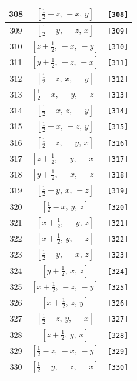 \documentclass[fleqn,8pt]{jsarticle}
\begin{document}
\begin{longtable}{ccc}
308 & $\left[ \frac{1}{2} - z,\, - x,\, y \right]$ & {\tt [308]} \\ \hline
309 & $\left[ \frac{1}{2} - y,\, - z,\, x \right]$ & {\tt [309]} \\ \hline
310 & $\left[ z + \frac{1}{2},\, - x,\, - y \right]$ & {\tt [310]} \\ \hline
311 & $\left[ y + \frac{1}{2},\, - z,\, - x \right]$ & {\tt [311]} \\ \hline
312 & $\left[ \frac{1}{2} - z,\, x,\, - y \right]$ & {\tt [312]} \\ \hline
313 & $\left[ \frac{1}{2} - x,\, - y,\, - z \right]$ & {\tt [313]} \\ \hline
314 & $\left[ \frac{1}{2} - x,\, z,\, - y \right]$ & {\tt [314]} \\ \hline
315 & $\left[ \frac{1}{2} - x,\, - z,\, y \right]$ & {\tt [315]} \\ \hline
316 & $\left[ \frac{1}{2} - z,\, - y,\, x \right]$ & {\tt [316]} \\ \hline
317 & $\left[ z + \frac{1}{2},\, - y,\, - x \right]$ & {\tt [317]} \\ \hline
318 & $\left[ y + \frac{1}{2},\, - x,\, - z \right]$ & {\tt [318]} \\ \hline
319 & $\left[ \frac{1}{2} - y,\, x,\, - z \right]$ & {\tt [319]} \\ \hline
320 & $\left[ \frac{1}{2} - x,\, y,\, z \right]$ & {\tt [320]} \\ \hline
321 & $\left[ x + \frac{1}{2},\, - y,\, z \right]$ & {\tt [321]} \\ \hline
322 & $\left[ x + \frac{1}{2},\, y,\, - z \right]$ & {\tt [322]} \\ \hline
323 & $\left[ \frac{1}{2} - y,\, - x,\, z \right]$ & {\tt [323]} \\ \hline
324 & $\left[ y + \frac{1}{2},\, x,\, z \right]$ & {\tt [324]} \\ \hline
325 & $\left[ x + \frac{1}{2},\, - z,\, - y \right]$ & {\tt [325]} \\ \hline
326 & $\left[ x + \frac{1}{2},\, z,\, y \right]$ & {\tt [326]} \\ \hline
327 & $\left[ \frac{1}{2} - z,\, y,\, - x \right]$ & {\tt [327]} \\ \hline
328 & $\left[ z + \frac{1}{2},\, y,\, x \right]$ & {\tt [328]} \\ \hline
329 & $\left[ \frac{1}{2} - z,\, - x,\, - y \right]$ & {\tt [329]} \\ \hline
330 & $\left[ \frac{1}{2} - y,\, - z,\, - x \right]$ & {\tt [330]} \\ \hline

\end{longtable}
\end{document}
